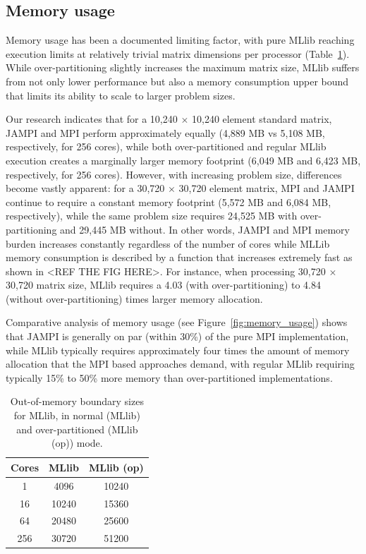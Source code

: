 \documentclass[fleqn,10pt]{SelfArx} %
\begin{document}
\subsection{Memory usage} %
\label{sub:memory_usage}

Memory usage has been a documented limiting factor, with pure MLlib reaching execution limits at relatively trivial matrix dimensions per processor (Table~\ref{tab:out_of_memory}). While over-partitioning slightly increases the maximum matrix size, MLlib suffers from not only lower performance but also a memory consumption upper bound that limits its ability to scale to larger problem sizes.

Our research indicates that for a 10,240 $\times$ 10,240 element standard matrix, JAMPI and MPI perform approximately equally (4,889 MB vs 5,108 MB, respectively, for 256 cores), while both over-partitioned and regular MLlib execution creates a marginally larger memory footprint (6,049 MB and 6,423 MB, respectively, for 256 cores).  However, with increasing problem size, differences become vastly apparent: for a 30,720 $\times$ 30,720 element matrix, MPI and JAMPI continue to require a constant memory footprint (5,572 MB and 6,084 MB, respectively), while the same problem size requires 24,525 MB with over-partitioning and 29,445 MB without. In other words, JAMPI and MPI memory burden increases constantly regardless of the number of cores while MLLib memory consumption is described by a function that increases extremely fast as shown in <REF THE FIG HERE>. For instance, when processing 30,720 $\times$ 30,720 matrix size, MLlib requires a 4.03 (with over-partitioning) to 4.84 (without over-partitioning) times larger memory allocation.

Comparative analysis of memory usage (see Figure~\ref{fig:memory_usage}) shows that JAMPI is generally on par (within 30\%) of the pure MPI implementation, while MLlib typically requires approximately four times the amount of memory allocation that the MPI based approaches demand, with regular MLlib requiring typically 15\% to 50\% more memory than over-partitioned implementations.

\begin{table}
	\centering
	\begin{tabular}{ |c|c|c| } 
	 \hline
	 Cores & MLlib & MLlib (op)  \\ 
	 \hline\hline
	 1 & 4096 & 10240 \\ 
	 \hline
	 16 & 10240 & 15360 \\ 
	 \hline
	 64 & 20480 & 25600 \\ 
	 \hline
	 256 & 30720 & 51200 \\ 
	 \hline
	\end{tabular}
	\caption{Out-of-memory boundary sizes for MLlib, in normal (MLlib) and over-partitioned (MLlib (op)) mode.}
	\label{tab:out_of_memory}
\end{table}
	
\end{document}
